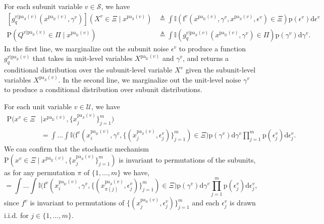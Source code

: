 \documentclass[12pt]{article}
\newcommand{\Sc}{\mathcal{S}}
\newcommand{\Uc}{\mathcal{U}}
\newcommand{\di}{\mathrm{d}}
\newcommand{\pa}{\mathrm{pa}}
\newcommand{\pr}{\mathrm{p}}
\newcommand{\Prob}{\mathrm{P}}
\newcommand{\f}{\mathrm{f}}
\begin{document}
For each subunit variable $v \in \mathcal{S}$, we have
\begin{equation} \label{eqn:subunit_hcgm_derivation}
\begin{split}
        [g_q^{v | \pa_{\mathcal{S}}(v)}(x^{\pa_{\mathcal{U}}(v)}, \gamma^{v})](X^{v} \in \Xi \mid x^{\pa_\Sc(v)}) & \triangleq \int \mathbb{I}(\f^{v}(x^{\pa_\Uc(v)}, \gamma^{v}, x^{\pa_\Sc(v)}, \epsilon^{v}) \in \Xi) \pr(\epsilon^{v}) \di \epsilon^{v}\\
        \Prob(Q^{v| \pa_\Sc(v)} \in \Pi \mid  x^{\pa_\Uc(v)}) & \triangleq \int \mathbb{I}(g_q^{v | \pa_\Sc(v)}(x^{\pa_{\Uc}(v)}, \gamma^{v}) \in \Pi) \pr(\gamma^{v}) \di\gamma^{v}.
\end{split}
\end{equation}
In the first line, we marginalize out the subunit noise $\epsilon^{v}$ to produce a function $g_q^{v | \pa_{\mathcal{S}}(v)}$ that takes in unit-level variables $X^{\pa_{\mathcal{U}}(v)}$ and $\gamma^{v}$, and returns a conditional distribution over the subunit-level variable $X^{v}$ given the subunit-level variables $X^{\pa_\Sc(v)}$.
In the second line, we marginalize out the unit-level noise $\gamma^{v}$ to produce a conditional distribution over subunit distributions.



For each unit variable $v \in \mathcal{U}$, we have
\begin{equation} \label{eqn:unit_hcgm_derivation}
\begin{split}
        \Prob(x^{v} \in \Xi &\mid x^{\pa_\Uc(v)}, \{x_{j}^{\pa_\Sc(v)}\}_{j=1}^m)\\ &= \int\ldots \int \mathbb{I}\big(\f^{v}(x_i^{\pa_\Uc(v)}, \gamma^{v}, \{(x_{j}^{\pa_\Sc(v)}, \epsilon_{j}^{v})\}_{j=1}^m) \in \Xi\big) \pr(\gamma^{v})\di\gamma^{v} \prod_{j=1}^m \pr(\epsilon^{v}_j) \di\epsilon^{v}_j.
\end{split}
\end{equation}
We can confirm that the stochastic mechanism $\Prob(x^{v} \in \Xi \mid x^{\pa_\Uc(v)}, \{x_{j}^{\pa_\Sc(v)}\}_{j=1}^m)$ is invariant to permutations of the subunits, as for any permutation $\pi$ of $\{1,\ldots,m\}$ we have,
\begin{equation}
=\int\ldots \int \mathbb{I}\big(\f^{v}(x_i^{\pa_\Uc(v)}, \gamma^{v}, \{(x_{\pi(j)}^{\pa_\Sc(v)}, \epsilon_{j}^{v})\}_{j=1}^m) \in \Xi\big) \pr(\gamma^{v})\di\gamma^{v} \prod_{j=1}^m \pr(\epsilon^{v}_j) \di\epsilon^{v}_j,
\end{equation}
since $f^{v}$ is invariant to permutations of $\{(x_{j}^{\pa_\Sc(v)}, \epsilon_{j}^{v})\}_{j=1}^m$ and each $\epsilon^{v}_j$ is drawn i.i.d. for $j \in \{1, \ldots, m\}$.
\end{document}
